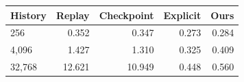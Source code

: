 \begin{tabular}{lrrrr}
\toprule
History & Replay & Checkpoint & Explicit & \textbf{Ours} \\
\midrule
256 & 0.352 & 0.347 & 0.273 & 0.284 \\
4,096 & 1.427 & 1.310 & 0.325 & 0.409 \\
32,768 & 12.621 & 10.949 & 0.448 & 0.560 \\
\bottomrule
\end{tabular}